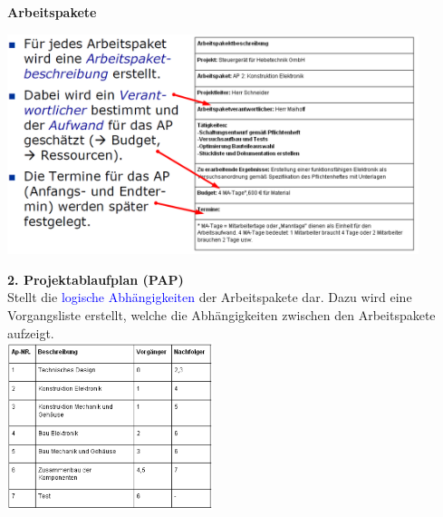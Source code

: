 \textbf{Arbeitspakete}\\
\begin{center}
\includegraphics[width = 12cm]{images/arbeitsbeschreibung}
\end{center}
\vspace{-0.5cm}
\begin{multicols}{2}
\textbf{2. Projektablaufplan (PAP)} \\
Stellt die \textcolor{blue}{logische Abhängigkeiten} der Arbeitspakete dar. Dazu wird eine Vorgangsliste erstellt, welche die Abhängigkeiten zwischen den Arbeitspakete aufzeigt. \\

\includegraphics[width = 6cm]{images/ablaufsplan}
\end{multicols}

